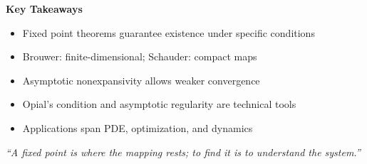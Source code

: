 \documentclass[aspectratio=169,10pt]{beamer}
\begin{document}
\begin{frame}[plain]
    \begin{center}
        \Large \textbf{Key Takeaways}

        \vspace{1cm}

        \begin{itemize}
            \item Fixed point theorems guarantee existence under specific conditions
            \item Brouwer: finite-dimensional; Schauder: compact maps
            \item Asymptotic nonexpansivity allows weaker convergence
            \item Opial's condition and asymptotic regularity are technical tools
            \item Applications span PDE, optimization, and dynamics
        \end{itemize}

        \vspace{1.5cm}

        \textit{``A fixed point is where the mapping rests; to find it is to understand the system.''}
    \end{center}
\end{frame}
\end{document}
